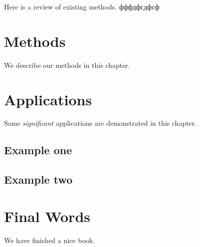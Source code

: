 \documentclass[
]{book}
\begin{document}
Here is a review of existing methods. фффдфсдфсф

\hypertarget{methods}{%
\chapter{Methods}\label{methods}}

We describe our methods in this chapter.

\hypertarget{applications}{%
\chapter{Applications}\label{applications}}

Some \emph{significant} applications are demonstrated in this chapter.

\hypertarget{example-one}{%
\section{Example one}\label{example-one}}

\hypertarget{example-two}{%
\section{Example two}\label{example-two}}

\hypertarget{final-words}{%
\chapter{Final Words}\label{final-words}}

We have finished a nice book.

  
\end{document}
